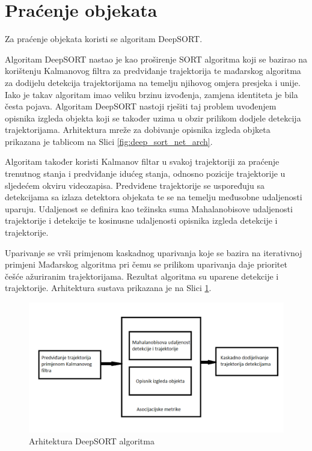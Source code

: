 \documentclass[times, utf8, seminar, numeric]{fer}
\begin{document}
\pagebreak
\section{Praćenje objekata}
Za praćenje objekata koristi se algoritam DeepSORT.

Algoritam DeepSORT nastao je kao proširenje SORT algoritma koji se bazirao na korištenju Kalmanovog filtra za predviđanje trajektorija te mađarskog algoritma za dodijelu detekcija trajektorijama na temelju njihovog omjera presjeka i unije. Iako je takav algoritam imao veliku brzinu izvođenja, zamjena identiteta je bila česta pojava. Algoritam DeepSORT nastoji rješiti taj problem uvođenjem opisnika izgleda objekta koji se također uzima u obzir prilikom dodjele detekcija trajektorijama. Arhitektura mreže za dobivanje opisnika izgleda objketa prikazana je tablicom na Slici \ref{fig:deep_sort_net_arch}.
  
Algoritam također koristi Kalmanov filtar u svakoj trajektoriji za praćenje trenutnog stanja i predviđanje idućeg stanja, odnosno pozicije trajektorije u sljedećem okviru videozapisa. 
Predviđene trajektorije se uspoređuju sa detekcijama sa izlaza detektora objekata te se na temelju međusobne udaljenosti uparuju.
Udaljenost se definira kao težinska suma Mahalanobisove udaljenosti trajektorije i detekcije te kosinusne udaljenosti opisnika izgleda detekcije i trajektorije. 

Uparivanje se vrši primjenom kaskadnog uparivanja koje se bazira na iterativnoj primjeni Mađarskog algoritma pri čemu se prilikom uparivanja daje prioritet češće ažuriranim trajektorijama. Rezultat algoritma su uparene detekcije i trajektorije. Arhitektura sustava prikazana je na Slici \ref{fig:deep_sort_arch}.




\begin{figure}
	\centering
	\includegraphics[scale=0.6]{slike/deep_sort_arch.png}
	\caption {Arhitektura DeepSORT algoritma}
	\label{fig:deep_sort_arch}	
\end{figure}
\end{document}
